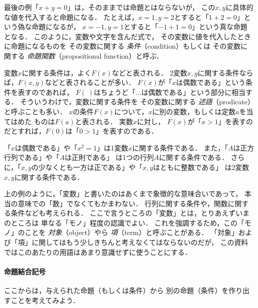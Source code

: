   最後の例「$x+y=0$」は，そのままでは命題とはならないが，
  この$x,  y$に具体的な値を代入すると命題になる．
  たとえば，$x=1,  y=2$とすると「$1+2=0$」という偽な命題になるが，
  $x=-1,  y=1$とすると「$-1+1=0$」という真な命題となる．
  このように，変数や文字を含んだ式で，
  その変数に値を代入したときに命題になるものを
  その変数に関する
  \emph{条件}（condition）もしくは
  その変数に関する
  \emph{命題関数}（propositional function）と呼ぶ．
  
  変数$x$に関する条件は，よく$F(x)$などと表される．
  2変数$x,  y$に関する条件ならば，$F(x, y)$などと表されることが多い．
  $F(x)$が「$x$は偶数である」という条件を表すのであれば，
  $F( \ )$はちょうど「...は偶数である」という部分に相当する．
  そういうわけで，変数に関する条件を
  その変数に関する
  \emph{述語}（prodicate）と呼ぶことも多い．
  $x$の条件$F(x)$について，$x$に別の変数，もしくは定数$a$を当てはめた
  ものは$F(a)$と表される．
  実数$x$に対し，
  $F(x)$が「$x>1$」を表すのだとすれば，$F(0)$は「$0>1$」を表すのである．

  \begin{ex}
    「$x$は偶数である」や「$x^2=1$」は1変数$x$に関する条件である．
    また，「$A$は正方行列である」や「$A$は正則である」
    は1つの行列$A$に関する条件である．
    さらに，「$x,  y$の少なくとも一方は正である」や「$x,  y$はともに整数である」
    は2変数$x,  y$に関する条件である．
  \end{ex}

  上の例のように，「変数」と書いたのはあくまで象徴的な意味合いであって，
  本当の意味での「数」でなくてもかまわない．
  行列に関する条件や，関数に関する条件なども考えられる．
  ここで言うところの「変数」とは，とりあえずいまのところは
  単なる「モノ」程度の認識でよい．
  これを強調するため，この「モノ」のことを
  \emph{対象}（object）やら
  \emph{項}（term）と呼ぶことがある．
  「対象」および「項」に関してはもう少しきちんと考えなくてはならないのだが，
  この資料ではこのあたりの用語はあまり意識せずに使うことにする．

  

  \paragraph{命題結合記号}
  ここからは，与えられた命題（もしくは条件）から
  別の命題（条件）を作り出すことを考えてみよう．
  
